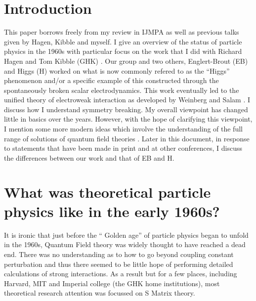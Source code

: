 \documentclass[letterpaper,twoside,preprintnumbers,slac_one]{revtex4}
\begin{document}
\section{Introduction}\label{sec:0}
%
This paper borrows freely from my review in IJMPA \cite{gg;2009} as
well as previous talks given by Hagen, Kibble and myself. I give an
overview of the status of particle physics in the 1960s with
particular focus on the work that I did with Richard Hagen and Tom
Kibble (GHK) \cite{ghk;1964}. Our group and two others, Englert-Brout
(EB) \cite{eb;1964} and Higgs (H) \cite{phpl;1964,ph;1964} worked on
what is now commonly refered to as the ``Higgs'' phenomenon and/or a
specific example of this constructed through the spontaneously broken
scalar electrodynamics. This work eventually led to the unified theory
of electroweak interaction as developed by Weinberg and Salam
\cite{sw;1967,as;1967}. I discuss how I understand symmetry
breaking. My overall viewpoint has changed little in basics over
the years. However, with the hope of clarifying this viewpoint, I mention some
more modern ideas which involve the understanding of the full range of
solutions of quantum field theories \cite{ggg;1996,ggzg;2007}. Later
in this document, in response to statements that have been made in
print and at other conferences, I discuss the differences between our
work and that of EB and H.
%
\section{What was theoretical particle physics like in the early 1960s?} \label{sec:1}
%
It is ironic that just before the `` Golden age'' of particle physics
began to unfold in the 1960s, Quantum Field theory was widely thought
to have reached a dead end. There was no understanding as to how to go
beyond coupling constant perturbation and thus there seemed to be
little hope of performing detailed calculations of strong interactions. As a result but
for a few places, including Harvard, MIT and Imperial college (the GHK
home institutions), most theoretical research attention was focussed
on S Matrix theory.
\end{document}
